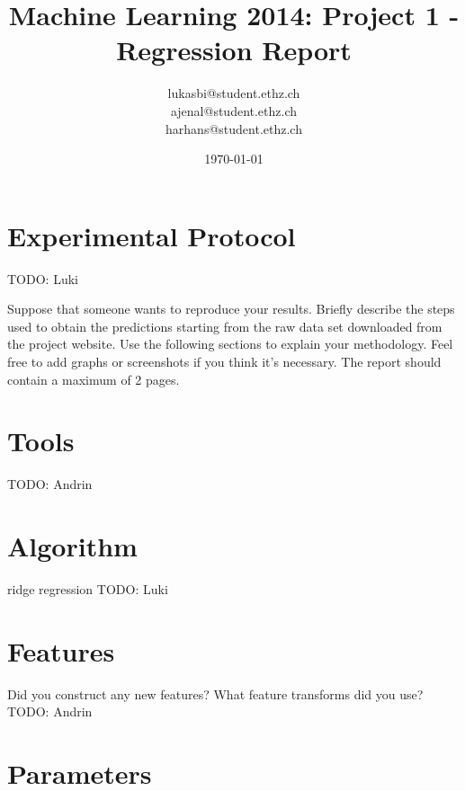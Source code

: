 \documentclass[a4paper, 11pt]{article}
\title{Machine Learning 2014: Project 1 - Regression Report}
\author{lukasbi@student.ethz.ch\\ ajenal@student.ethz.ch\\ harhans@student.ethz.ch\\}
\date{\today}
\begin{document}
\lstset{language=Matlab} 
\maketitle

\section*{Experimental Protocol}

TODO: Luki

Suppose that someone wants to reproduce your results. Briefly describe the steps used to obtain the
predictions starting from the raw data set downloaded from the project website. Use the following
sections to explain your methodology. Feel free to add graphs or screenshots if you think it's
necessary. The report should contain a maximum of 2 pages.

\section{Tools}

TODO: Andrin


\section{Algorithm}
ridge regression TODO: Luki

\section{Features}
Did you construct any new features? What feature transforms did you use? TODO: Andrin

\section{Parameters}
\end{document}

